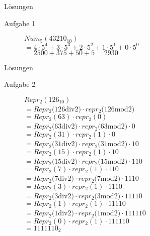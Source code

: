 \begin{frame}{Lösungen}
	\small
	\begin{description}
		\item[Aufgabe 1] $Num_{5}(43210_{10})$\\
		      \pause
		      $=4\cdot 5^{4}+3\cdot 5^{3}+2\cdot 5^{2}+1\cdot 5^{1}+0\cdot 5^{0}$\\
		      \pause
		      $=2500+375+50+5=2930$
	\end{description}
\end{frame}

\begin{frame}{Lösungen}
	\small
	\begin{description}
		\item[Aufgabe 2] $Repr_{2}(126_{10})$\\
		      \pause
		      $=Repr_{2}(126$div$2)\cdot repr_{2}(126$mod$2)$\\
		      \pause
		      $=Repr_{2}(63)\cdot repr_{2}(0)$\\
		      \pause
		      $=Repr_{2}(63$div$2)\cdot repr_{2}(63$mod$2)\cdot 0$\\
		      \pause
		      $=Repr_{2}(31)\cdot repr_{2}(1)\cdot 0$\\
		      \pause
		      $=Repr_{2}(31$div$2)\cdot repr_{2}(31$mod$2)\cdot 10$\\
		      \pause
		      $=Repr_{2}(15)\cdot repr_{2}(1)\cdot 10$\\
		      \pause
		      $=Repr_{2}(15$div$2)\cdot repr_{2}(15$mod$2)\cdot 110$\\
		      \pause
		      $=Repr_{2}(7)\cdot repr_{2}(1)\cdot 110$\\
		      \pause
		      $=Repr_{2}(7$div$2)\cdot repr_{2}(7$mod$2)\cdot 1110$\\
		      \pause
		      $=Repr_{2}(3)\cdot repr_{2}(1)\cdot 1110$\\
		      \pause
		      $=Repr_{2}(3$div$2)\cdot repr_{2}(3$mod$2)\cdot 11110$\\
		      \pause
		      $=Repr_{2}(1)\cdot repr_{2}(1)\cdot 11110$\\
		      \pause
		      $=Repr_{2}(1$div$2)\cdot repr_{2}(1$mod$2)\cdot 111110$\\
		      \pause
		      $=Repr_{2}(0)\cdot repr_{2}(1)\cdot 111110$\\
		      \pause
		      $=1111110_{2}$\\
	\end{description}
\end{frame}

